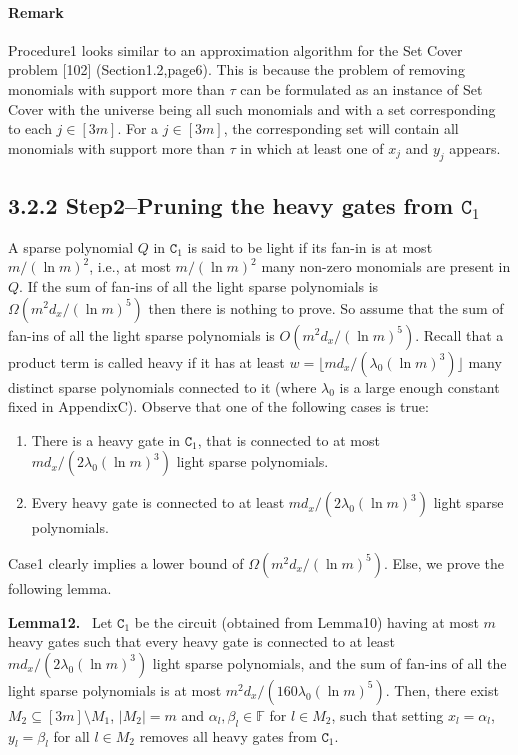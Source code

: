 \documentclass[10pt,a4paper]{article}
\newenvironment{authorclaim}[1]{\par\medskip\noindent\textbf{#1.}\ \ignorespaces}{\par\medskip}
\begin{document}
\paragraph{Remark}
Procedure1 looks similar to an approximation algorithm for the Set Cover problem [102] (Section1.2,page6). This is because the problem of removing monomials with support more than $\tau$ can be formulated as an instance of Set Cover with the universe being all such monomials and with a set corresponding to each $j\in[3m]$. For a $j\in[3m]$, the corresponding set will contain all monomials with support more than $\tau$ in which at least one of $x_j$ and $y_j$ appears.
\subsection*{3.2.2 Step2--Pruning the heavy gates from $\mathtt C_1$}
A sparse polynomial $Q$ in $\mathtt C_1$ is said to be light if its fan-in is at most $m/(\ln m)^2$, i.e., at most $m/(\ln m)^2$ many non-zero monomials are present in $Q$. If the sum of fan-ins of all the light sparse polynomials is $\Omega(m^2d_x/(\ln m)^5)$ then there is nothing to prove. So assume that the sum of fan-ins of all the light sparse polynomials is $O(m^2d_x/(\ln m)^5)$. Recall that a product term is called heavy if it has at least $w=\lfloor md_x/(\lambda_0(\ln m)^3)\rfloor$ many distinct sparse polynomials connected to it (where $\lambda_0$ is a large enough constant fixed in AppendixC). Observe that one of the following cases is true:
\begin{enumerate}
\item There is a heavy gate in $\mathtt C_1$, that is connected to at most $md_x/(2\lambda_0(\ln m)^3)$ light sparse polynomials.
\item Every heavy gate is connected to at least $md_x/(2\lambda_0(\ln m)^3)$ light sparse polynomials.
\end{enumerate}
Case1 clearly implies a lower bound of $\Omega(m^2d_x/(\ln m)^5)$. Else, we prove the following lemma.
\begin{authorclaim}{Lemma12}
Let $\mathtt C_1$ be the circuit (obtained from Lemma10) having at most $m$ heavy gates such that every heavy gate is connected to at least $md_x/(2\lambda_0(\ln m)^3)$ light sparse polynomials, and the sum of fan-ins of all the light sparse polynomials is at most $m^2d_x/(160\lambda_0(\ln m)^5)$. Then, there exist $M_2\subseteq[3m]\setminus M_1$, $|M_2|=m$ and $\alpha_l,\beta_l\in\mathbb F$ for $l\in M_2$, such that setting $x_l=\alpha_l$, $y_l=\beta_l$ for all $l\in M_2$ removes all heavy gates from $\mathtt C_1$.
\end{authorclaim}
\end{document}
